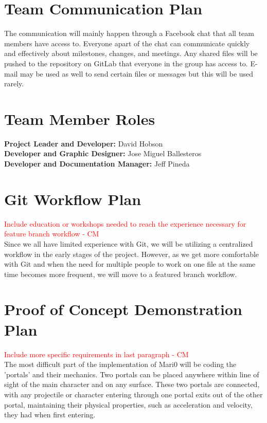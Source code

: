 \documentclass{article}
\begin{document}
\section{Team Communication Plan}
The communication will mainly happen through a Facebook chat that all team members have access to. Everyone apart of the chat can communicate quickly and effectively about milestones, changes, and meetings. Any shared files will be pushed to the repository on GitLab that everyone in the group has access to. E-mail may be used as well to send certain files or messages but this will be used rarely. 

\section{Team Member Roles}
\textbf{Project Leader and Developer:}  David Hobson\\
\textbf{Developer and Graphic Designer:}  Jose Miguel Ballesteros\\
\textbf{Developer and Documentation Manager:}  Jeff Pineda\\

\section{Git Workflow Plan}
\textcolor{red}{Include education or workshops needed to reach the experience necessary for feature branch workflow - CM} \\
Since we all have limited experience with Git, we will be utilizing a centralized workflow in the early stages of the project. However, as we get more comfortable with Git and when the need for multiple people to work on one file at the same time becomes more frequent, we will move to a featured branch workflow.

\section{Proof of Concept Demonstration Plan}
\textcolor{red}{Include more specific requirements in last paragraph - CM} \\
The most difficult part of the implementation of Mari0 will be coding the 'portals' and their mechanics. Two portals can be placed anywhere within line of sight of the main character and on any surface. These two portals are connected, with any projectile or character entering through one portal exits out of the other portal, maintaining their physical properties, such as acceleration and velocity, they had when first entering.
\end{document}
